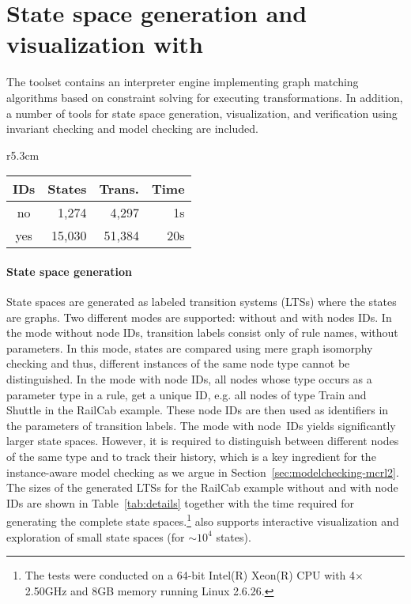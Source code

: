 
\section{State space generation and visualization with \henshin}
\label{sec:statespaces}

The \henshin toolset contains an interpreter engine implementing graph matching algorithms based on constraint solving for executing transformations. In addition, a number of tools for state space generation, visualization, and verification using invariant checking and model checking are included.

\begin{wraptable}{r}{5.3cm}
\vspace{-3mm}
\centering
\begin{tabular}{|c||r|r|r|}
\hline
IDs & States	& Trans. & Time \\ \hline\hline
no  & 1,274		& 4,297  & 1s \\ \hline
yes & 15,030	& 51,384 & 20s \\ \hline
\end{tabular}
\caption{RailCab LTS details}
\label{tab:details}
\vspace{-3mm}
\end{wraptable}
\halflineup\paragraph{State space generation}
State spaces are generated as labeled transition systems (LTSs) where the states are graphs. 
Two different modes are supported: without and with nodes IDs. In the mode without node IDs, transition labels consist only of rule names, without parameters. In this mode, states are compared using mere graph isomorphy checking and thus, different instances of the same node type cannot be distinguished. In the mode with node IDs, all nodes whose type occurs as a parameter type in a rule, get a unique ID, e.g. all nodes of type \textsf{Train} and \textsf{Shuttle} in the RailCab example. These node IDs are then used as identifiers in the parameters of transition labels. The mode with node~IDs yields  significantly larger state spaces. However, it is required to distinguish between different nodes of the same type and to track their history, which is a key ingredient for the instance-aware model checking as we argue in Section~\ref{sec:modelchecking-mcrl2}.
The sizes of the generated LTSs for the RailCab example without and with node IDs are shown in Table~\ref{tab:details} together with the time required for generating the complete state spaces.\footnote{The tests were conducted on a 64-bit Intel(R) Xeon(R) CPU with 4$\times$2.50GHz and 8GB memory
running Linux 2.6.26.} \henshin also supports interactive visualization and exploration of small state spaces (for $\sim\!10^4$ states).


